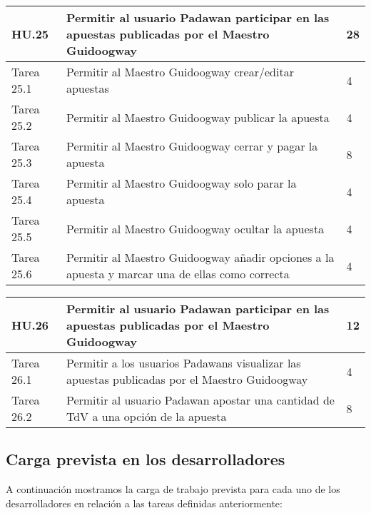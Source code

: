 \begin{table}[h]
	\centering
	\begin{tabular}{| p{2.3cm} | p{6.7cm} | p{2cm} |}
		\rowcolor[HTML]{329A9D} 
		{\color[HTML]{FFFFFF} \textbf{HU.25}} & {\color[HTML]{FFFFFF} \textbf{Permitir al usuario Padawan participar en las apuestas publicadas por el Maestro Guidoogway}} & {\color[HTML]{FFFFFF} \textbf{28}}  \\ \hline
		Tarea 25.1 & Permitir al Maestro Guidoogway crear/editar apuestas & 4 \\ \hline
		Tarea 25.2 & Permitir al Maestro Guidoogway publicar la apuesta & 4 \\ \hline
		Tarea 25.3 & Permitir al Maestro Guidoogway cerrar y pagar la apuesta & 8 \\ \hline
		Tarea 25.4 & Permitir al Maestro Guidoogway solo parar la apuesta & 4 \\ \hline
		Tarea 25.5 & Permitir al Maestro Guidoogway ocultar la apuesta & 4 \\ \hline
		Tarea 25.6 & Permitir al Maestro Guidoogway añadir opciones a la apuesta y marcar una de ellas como correcta & 4 \\ \hline
	\end{tabular}
\end{table}

\begin{table}[h]
	\centering
	\begin{tabular}{| p{2.3cm} | p{6.7cm} | p{2cm} |}
		\rowcolor[HTML]{329A9D} 
		{\color[HTML]{FFFFFF} \textbf{HU.26}} & {\color[HTML]{FFFFFF} \textbf{Permitir al usuario Padawan participar en las apuestas publicadas por el Maestro Guidoogway}} & {\color[HTML]{FFFFFF} \textbf{12}}  \\ \hline
		Tarea 26.1 & Permitir a los usuarios Padawans visualizar las apuestas publicadas por el Maestro Guidoogway & 4 \\ \hline
		Tarea 26.2 & Permitir al usuario Padawan apostar una cantidad de TdV a una opción de la apuesta & 8 \\ \hline
	\end{tabular}
\end{table}

\newpage

\subsection{Carga prevista en los desarrolladores}

A continuación mostramos la carga de trabajo prevista para cada uno de los desarrolladores en relación a las tareas definidas anteriormente:

